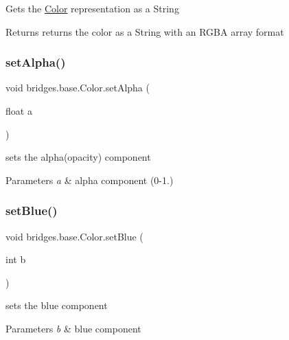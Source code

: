 Gets the \mbox{\hyperlink{classbridges_1_1base_1_1_color}{Color}} representation as a String

\begin{DoxyReturn}{Returns}
returns the color as a String with an R\+G\+BA array format 
\end{DoxyReturn}
\mbox{\label{classbridges_1_1base_1_1_color_afab07ce64efa1fa5797795670b0effb6}} 
\subsubsection{\texorpdfstring{set\+Alpha()}{setAlpha()}}
{\footnotesize\ttfamily void bridges.\+base.\+Color.\+set\+Alpha (\begin{DoxyParamCaption}\item[{float}]{a }\end{DoxyParamCaption})}

sets the alpha(opacity) component


\begin{DoxyParams}{Parameters}
{\em a} & alpha component (0-\/1.) \\
\hline
\end{DoxyParams}
\mbox{\label{classbridges_1_1base_1_1_color_a0e04156b1573cf8002c4d9cb69825657}} 
\subsubsection{\texorpdfstring{set\+Blue()}{setBlue()}}
{\footnotesize\ttfamily void bridges.\+base.\+Color.\+set\+Blue (\begin{DoxyParamCaption}\item[{int}]{b }\end{DoxyParamCaption})}

sets the blue component


\begin{DoxyParams}{Parameters}
{\em b} & blue component \\
\hline
\end{DoxyParams}
\mbox{\label{classbridges_1_1base_1_1_color_a5559b1c7eb4c3901526b1012029b528f}} 
